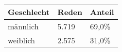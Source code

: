 
\begin{tabular}{lll}
\toprule
Geschlecht & Reden & Anteil\\
\midrule
männlich & 5.719 & 69,0\%\\
weiblich & 2.575 & 31,0\%\\
\bottomrule
\end{tabular}